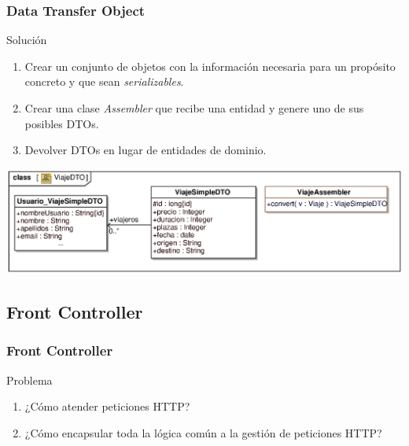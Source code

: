 \documentclass[handout,a4paper,slidestop,xcolor=pst,blue]{beamer}
\begin{document}
\begin{frame}[c]
    \frametitle{Data Transfer Object}
    \begin{block}{Solución}
        \begin{enumerate}[<+->]
            \item Crear un conjunto de objetos con la información necesaria para un propósito concreto y que sean \emph{serializables}.
            \item Crear una clase \emph{Assembler} que recibe una entidad y genere uno de sus posibles DTOs.
            \item Devolver DTOs en lugar de entidades de dominio.
        \end{enumerate}
    \end{block}
    \begin{center}
        \includegraphics[width=\linewidth]{images/patterns/dto01.eps}
    \end{center}
\end{frame}

\subsection{Front Controller}

\begin{frame}[c]
    \frametitle{Front Controller}
    \begin{block}{Problema}
        \begin{enumerate}[<+->]
            \item ¿Cómo atender peticiones HTTP? 
            \item ¿Cómo encapsular toda la lógica común a la gestión de peticiones HTTP?
        \end{enumerate}
    \end{block}
\end{frame}
\end{document}
